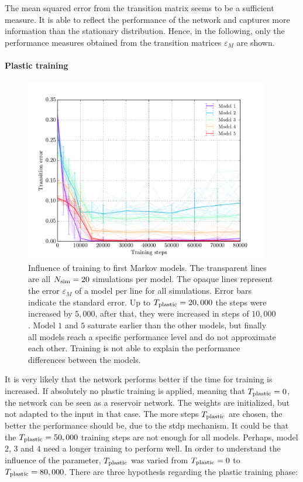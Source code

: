 The mean squared error from the transition matrix seems to be a sufficient measure. It is able to reflect the performance of the network and captures more information than the stationary distribution. Hence, in the following, only the performance measures obtained from the transition matrices  $\varepsilon_M$ are shown.

\paragraph{Plastic training}

\begin{figure}[!b]
	\centering
	\includegraphics[width=0.95\textwidth]{results/mc1_distances_training_steps_transition}
	\caption[Influence of training to first Markov models]{Influence of training to first Markov models. The transparent lines are all $N_{\text{sim}}=20$ simulations per model. The opaque lines represent the error $\varepsilon_M$ of a model per line for all simulations. Error bars indicate the standard error. Up to $T_{\text{plastic}} = 20,000$ the steps were increased by $5,000$, after that, they were increased in steps of $10,000$. Model $1$ and $5$ saturate earlier than the other models, but finally all models reach a specific performance level and do not approximate each other. Training is not able to explain the performance differences between the models.}
	\label{fig:mc1-training}
\end{figure}

It is very likely that the network performs better if the time for training is increased. If absolutely no plastic training is applied, meaning that $T_{\text{plastic}} = 0$, the network can be seen as a reservoir network. The weights are initialized, but not adapted to the input in that case. The more steps $T_{\text{plastic}}$ are chosen, the better the performance should be, due to the \acs{stdp} mechanism. It could be that the $T_{\text{plastic}} = 50,000$ training steps are not enough for all models. Perhaps, model $2$, $3$ and $4$ need a longer training to perform well. In order to understand the influence of the parameter, $T_{\text{plastic}}$ was varied from $T_{\text{plastic}} = 0$ to $T_{\text{plastic}} = 80,000$. There are three hypothesis regarding the plastic training phase:


